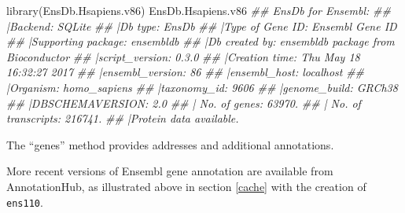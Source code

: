 \documentclass[]{article}
\newcommand{\hlcom}[1]{\textcolor[rgb]{0.502,0.502,0.502}{\textit{#1}}}%
\newcommand{\hlopt}[1]{\textcolor[rgb]{0,0,0}{#1}}%
\newcommand{\hlstd}[1]{\textcolor[rgb]{0.251,0.251,0.251}{#1}}%
\newcommand{\hlkwd}[1]{\textcolor[rgb]{0.878,0.439,0.125}{#1}}%
\newenvironment{Shaded}{\begin{myshaded}}{\end{myshaded}}
\newcommand{\KeywordTok}[1]{\hlkwd{#1}}
\newcommand{\CommentTok}[1]{\hlcom{#1}}
\newcommand{\OperatorTok}[1]{\hlopt{#1}}
\newcommand{\NormalTok}[1]{\hlstd{#1}}
\begin{document}
\begin{Shaded}
\begin{Highlighting}[]
\KeywordTok{library}\NormalTok{(EnsDb.Hsapiens.v86)}
\NormalTok{EnsDb.Hsapiens.v86}
\CommentTok{\#\# EnsDb for Ensembl:}
\CommentTok{\#\# |Backend: SQLite}
\CommentTok{\#\# |Db type: EnsDb}
\CommentTok{\#\# |Type of Gene ID: Ensembl Gene ID}
\CommentTok{\#\# |Supporting package: ensembldb}
\CommentTok{\#\# |Db created by: ensembldb package from Bioconductor}
\CommentTok{\#\# |script\_version: 0.3.0}
\CommentTok{\#\# |Creation time: Thu May 18 16:32:27 2017}
\CommentTok{\#\# |ensembl\_version: 86}
\CommentTok{\#\# |ensembl\_host: localhost}
\CommentTok{\#\# |Organism: homo\_sapiens}
\CommentTok{\#\# |taxonomy\_id: 9606}
\CommentTok{\#\# |genome\_build: GRCh38}
\CommentTok{\#\# |DBSCHEMAVERSION: 2.0}
\CommentTok{\#\# | No. of genes: 63970.}
\CommentTok{\#\# | No. of transcripts: 216741.}
\CommentTok{\#\# |Protein data available.}
\end{Highlighting}
\end{Shaded}

The ``genes'' method provides addresses and additional
annotations.

\begin{Shaded}
\end{Shaded}

More recent versions of Ensembl gene annotation are available
from AnnotationHub, as illustrated above in section \ref{cache} with
the creation of \texttt{ens110}.
\end{document}
